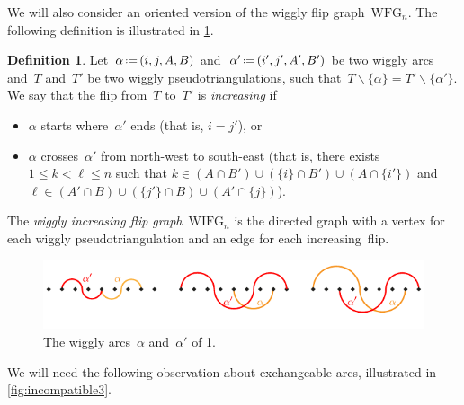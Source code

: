 \documentclass{amsart}
\theoremstyle{definition}
\newtheorem{definition}[theorem]{Definition}
\newcommand{\ssm}{\smallsetminus} %
\newcommand{\eqdef}{\mbox{\,\raisebox{0.2ex}{\scriptsize\ensuremath{\mathrm:}}\ensuremath{=}\,}} %
\newcommand{\darkblue}{\color{darkblue}} %
\newcommand{\defn}[1]{\textsl{\darkblue #1}} %
\newcommand{\wigglyFlipGraph}{\mathrm{WFG}} %
\newcommand{\wigglyIncreasingFlipGraph}{\mathrm{WIFG}} %
\begin{document}
We will also consider an oriented version of the wiggly flip graph~$\wigglyFlipGraph_n$.
The following definition is illustrated in \cref{fig:incompatible2}.

\begin{definition}
\label{def:wigglyIncreasingFlipGraph}
Let~$\alpha \eqdef (i, j, A, B)$ and~$\alpha' \eqdef (i', j', A', B')$ be two wiggly arcs and~$T$ and~$T'$ be two wiggly pseudotriangulations, such that~$T \ssm \{\alpha\} = T' \ssm \{\alpha'\}$.
We say that the flip from~$T$ to~$T'$ is \defn{increasing} if 
\begin{itemize}
\item $\alpha$ starts where~$\alpha'$ ends (that is, $i = j'$), or 
\item $\alpha$ crosses~$\alpha'$ from north-west to south-east (that is, there exists~$1 \le k < \ell \le n$ such that $k \in (A \cap B') \cup (\{i\} \cap B') \cup (A \cap \{i'\})$ and~$\ell \in (A' \cap B) \cup (\{j'\} \cap B) \cup (A' \cap \{j\})$).
\end{itemize}
The \defn{wiggly increasing flip graph}~$\wigglyIncreasingFlipGraph_n$ is the directed graph with a vertex for each wiggly pseudotriangulation and an edge for each increasing~flip.
%
\begin{figure}
\centerline{\includegraphics[scale=1.3]{incompatible2}}
\caption{The wiggly arcs~$\alpha$ and~$\alpha'$ of \cref{def:wigglyIncreasingFlipGraph}.}
\label{fig:incompatible2}
\end{figure}
\end{definition}

We will need the following observation about exchangeable arcs, illustrated in \cref{fig:incompatible3}.
\end{document}
